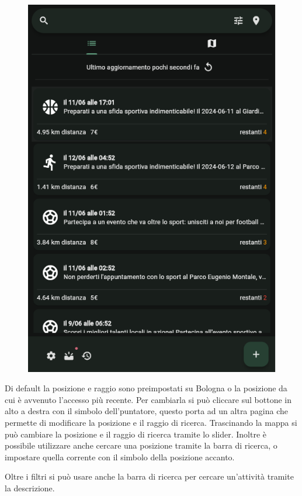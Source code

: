 \documentclass[a4paper,12pt]{article}
\begin{document}
\begin{figure}[h]
\begin{minipage}{0.32\textwidth}
        \includegraphics[width=1\linewidth]{img/Search.png}
    \end{minipage}
\end{figure}

Di default la posizione e raggio sono preimpostati su Bologna o la posizione da cui è avvenuto l'accesso più recente.
Per cambiarla si può cliccare sul bottone in alto a destra con il simbolo dell'puntatore, questo porta ad un altra pagina che permette di modificare la posizione e il raggio di ricerca.
Trascinando la mappa si può cambiare la posizione e il raggio di ricerca tramite lo slider.
Inoltre è possibile utilizzare anche cercare una posizione tramite la barra di ricerca, o impostare quella corrente con il simbolo della posizione accanto.

Oltre i filtri si può usare anche la barra di ricerca per cercare un'attività tramite la descrizione.
\end{document}
